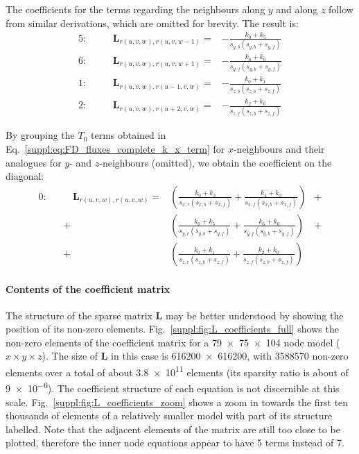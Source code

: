 The coefficients for the terms regarding the neighbours along $y$ and along $z$ follow from similar derivations, which are omitted for brevity.
The result is:
\begin{align}
    \label{suppl:eq:L_coefficients_y_z_terms}
    5: &&\quad \bm{L}_{r(u,v,w),r(u,v,w-1)} = & - \frac{k_0 + k_5}{s_{y,b} (s_{y,b} + s_{y,f})} \\[2ex]
    6: &&\quad \bm{L}_{r(u,v,w),r(u,v,w+1)} = & - \frac{k_6 + k_0}{s_{y,f} (s_{y,b} + s_{y,f})} \\[2ex]
    1: &&\quad \bm{L}_{r(u,v,w),r(u-1,v,w)} = & - \frac{k_0 + k_1}{s_{z,b} (s_{z,b} + s_{z,f})} \\[2ex]
    2: &&\quad \bm{L}_{r(u,v,w),r(u+2,v,w)} = & - \frac{k_2 + k_0}{s_{z,f} (s_{z,b} + s_{z,f})}
\end{align}

By grouping the $T_0$ terms obtained in Eq.~\ref{suppl:eq:FD_fluxes_complete_k_x_term} for $x$-neighbours and their analogues for $y$- and $z$-neighbours (omitted), we obtain the coefficient on the diagonal:
\begin{align}
    \label{suppl:eq:L_coefficients_diagonal_full}
    0: &&\quad \bm{L}_{r(u,v,w),r(u,v,w)} = &
    \left(
        \frac{k_0 + k_3}{s_{x,r} (s_{x,b} + s_{x,f})} +
        \frac{k_4 + k_0}{s_{x,f} (s_{x,b} + s_{x,f})} \right) & + \nonumber \\[2ex]
    && + & \left(
        \frac{k_0 + k_5}{s_{y,r} (s_{y,b} + s_{y,f})} +
        \frac{k_6 + k_0}{s_{y,f} (s_{y,b} + s_{y,f})} \right) & + \nonumber \\[2ex]
    && + & \left(
        \frac{k_0 + k_1}{s_{z,r} (s_{z,b} + s_{z,f})} +
        \frac{k_2 + k_0}{s_{z,f} (s_{z,b} + s_{z,f})} \right)
\end{align}

\FloatBarrier

\paragraph*{Contents of the coefficient matrix}
The structure of the sparse matrix $\bm{L}$ may be better understood by showing the position of its non-zero elements.
Fig.~\ref{suppl:fig:L_coefficients_full} shows the non-zero elements of the coefficient matrix for a \num{79}~$\times$~\num{75}~$\times$~\num{104} node model ($x \times y \times z$).
The size of $\bm{L}$ in this case is \num{616200}~$\times$~\num{616200}, with \num{3588570} non-zero elements over a total of about \num{3.8e11} elements (its sparsity ratio is about of \num{9e-6}).
The coefficient structure of each equation is not discernible at this scale.
Fig.~\ref{suppl:fig:L_coefficients_zoom} shows a zoom in towards the first ten thousands of elements of a relatively smaller model with part of its structure labelled.
Note that the adjacent elements of the matrix are still too close to be plotted, therefore the inner node equations appear to have \num{5} terms instead of \num{7}.

